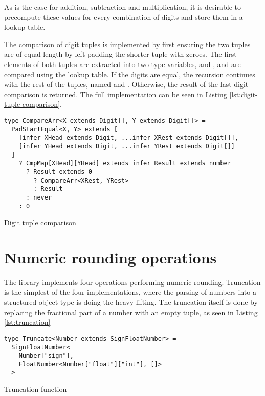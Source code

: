 As is the case for addition, subtraction and multiplication, it is desirable to precompute these values for every combination of digits and store them in a lookup table.

The comparison of digit tuples is implemented by first ensuring the two tuples are of equal length by left-padding the shorter tuple with zeroes. The first elements of both tuples are extracted into two type variables,  and , and are compared using the lookup table. If the digits are equal, the recursion continues with the rest of the tuples, named  and . Otherwise, the result of the last digit comparison is returned. The full implementation can be seen in Listing \ref{lst:digit-tuple-comparison}.

\begin{listing}[ht]
  \begin{verbatim}
type CompareArr<X extends Digit[], Y extends Digit[]> = 
  PadStartEqual<X, Y> extends [
    [infer XHead extends Digit, ...infer XRest extends Digit[]],
    [infer YHead extends Digit, ...infer YRest extends Digit[]]
  ]
    ? CmpMap[XHead][YHead] extends infer Result extends number
      ? Result extends 0
        ? CompareArr<XRest, YRest>
        : Result
      : never
    : 0
\end{verbatim}
  \caption{Digit tuple comparison}\label{lst:digit-tuple-comparison}
\end{listing}

\section{Numeric rounding operations}

The library implements four operations performing numeric rounding. Truncation is the simplest of the four implementations, where the parsing of numbers into a structured object type is doing the heavy lifting. The truncation itself is done by replacing the fractional part of a number with an empty tuple, as seen in Listing \ref{lst:truncation}

\begin{listing}[ht]
  \begin{verbatim}
type Truncate<Number extends SignFloatNumber> =
  SignFloatNumber<
    Number["sign"], 
    FloatNumber<Number["float"]["int"], []>
  >
\end{verbatim}
  \caption{Truncation function}\label{lst:truncation}
\end{listing}


